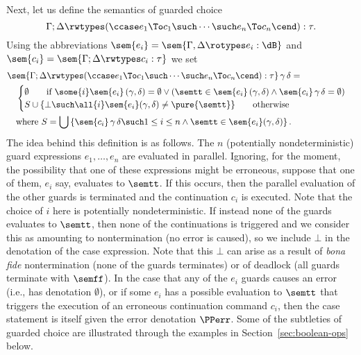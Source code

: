 Next, let us define the semantics of guarded choice
%
\begin{equation*}
  \Gamma ; \Delta \rwtypes (\ccase e_1 \To c_1 \such \cdots \such e_n \To c_n \cend) : \tau.
\end{equation*}
%
Using the abbreviations
%
$\sem{e_i} = \sem{\Gamma, \Delta \rotypes e_i : \dB}$
and
$\sem{c_i} = \sem{\Gamma; \Delta \rwtypes c_i : \tau}$
%
we set
%
\begin{align*}
  &\sem{\Gamma ; \Delta \rwtypes (\ccase e_1 \To c_1 \such \cdots \such e_n \To c_n \cend) : \tau} \, \gamma \, \delta = 
  \\
  &\quad
  \begin{cases}
    \emptyset \qquad\text{if $\some{i} \sem{e_i} \, (\gamma, \delta) = \emptyset \lor (\semtt \in \sem{e_i} \, (\gamma, \delta) \land \sem{c_i} \, \gamma \, \delta = \emptyset)$}
    \\
    S
    \cup \{ \bot \such \all{i} \sem{e_i} (\gamma, \delta) \neq \pure{\semtt} \}
    \qquad\text{otherwise}
  \end{cases}
  \\
  &\quad\text{where $S = \bigcup \left\{\sem{c_i} \, \gamma \, \delta \such
                 1 \leq i \leq n \land
                \semtt \in \sem{e_i} (\gamma, \delta) \right\}.$}
\end{align*}
The idea behind this definition is as follows. 
The $n$ (potentially nondeterministic) guard expressions $e_1, \dots, e_n$ are evaluated in parallel. 
Ignoring, for the moment, the possibility that one of these expressions might be erroneous, suppose
that one of them, 
$e_i$ say, evaluates to $\semtt$. If this occurs, then the parallel evaluation of the other guards is terminated and the continuation
$c_i$ is executed. Note that the choice of $i$ here is potentially nondeterministic.
If instead none of the guards evaluates to  $\semtt$, then none of the continuations is triggered and we consider this as amounting to nontermination (no error is caused), so we include 
$\bot$ in the denotation of the case expression. Note that this $\bot$ can arise as a result of \emph{bona fide} nontermination
(none of the guards terminates) or of deadlock (all guards terminate with $\semff$).
In the case that any of the $e_i$ guards causes an error (i.e., has denotation $\emptyset$), or if some $e_i$ has a possible evaluation to $\semtt$ that triggers the execution of an erroneous continuation command $c_i$, then the case statement is itself given the error denotation $\PPerr$.
Some of the subtleties of guarded choice are illustrated through the examples in
Section~\ref{sec:boolean-ops} below. 



